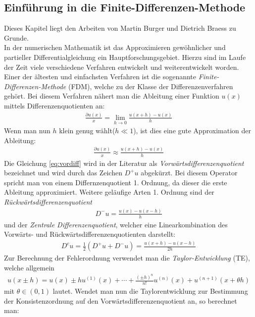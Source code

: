 \documentclass[12pt,titlepage]{article}
\begin{document}
\subsection{Einführung in die Finite-Differenzen-Methode}\label{sec:FD}
Dieses Kapitel liegt den Arbeiten von Martin Burger \cite{burger2006numerik} und Dietrich Braess \cite{braess2013finite} zu Grunde.\\
In der numerischen Mathematik ist das Approximieren gewöhnlicher und partieller Differentialgleichung ein Hauptforschungsgebiet. Hierzu sind im Laufe der Zeit viele verschiedene Verfahren entwickelt und weiterentwickelt worden. Einer der ältesten  und einfachsten Verfahren ist die sogenannte \textit{Finite-Differenzen-Methode} (FDM), welche zu der Klasse der Differenzenverfahren gehört. Bei diesem Verfahren nähert man die Ableitung einer Funktion $u(x)$ mittels Differenzenquotienten an:
\begin{align}
 \frac{\partial u(x)}{x}=\lim\limits_{h \rightarrow 0} \frac{u(x+h)-u(x)}{h}\nonumber
\end{align}
Wenn man nun $h$ klein genug wählt($h\ll1$), ist dies eine gute Approximation der Ableitung:
\begin{align}
 \frac{\partial u(x)}{x}\approx \frac{u(x+h)-u(x)}{h}\label{eq:vordiff}
\end{align}
Die Gleichung \eqref{eq:vordiff} wird in der Literatur als \textit{Vorwärtsdifferenzenquotient} bezeichnet und wird durch das Zeichen $D^+u$ abgekürzt. Bei diesem Operator spricht man von einem Differnzenquotient 1. Ordnung, da dieser die erste Ableitung approximiert. Weitere geläufige Arten 1. Ordnung sind der \textit{Rückwärtsdifferenzenquotient}
\begin{align}
 D^-u= \frac{u(x)-u(x-h)}{h}\nonumber
\end{align}
und der \textit{Zentrale Differenzenquotient}, welcher eine Linearkombination des Vorwärts- und Rückwärtsdifferenzenquotienten darstellt:
\begin{align}
 D^cu=\frac{1}{2}(D^+u+D^-u)= \frac{u(x+h)-u(x-h)}{2h}\nonumber
\end{align}
Zur Berechnung der Fehlerordnung verwendet man die \textit{Taylor-Entwicklung} (TE), welche allgemein
\begin{align}
 u(x\pm h)=u(x)\pm hu^{(1)}(x)+\cdots+\frac{(\pm h)^n}{n!}u^{(n)}(x)+u^{(n+1)}(x+\theta h)\nonumber
\end{align}
mit $\theta\in(0,1)$ lautet. Wendet man nun die Taylorentwicklung zur Bestimmung der Konsistenzordnung auf den Vorwärtsdifferenzenquotient an, so berechnet man:
\end{document}
